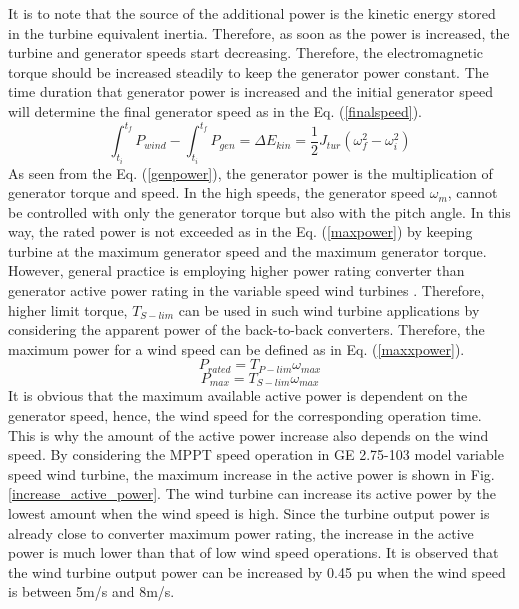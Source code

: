 It is to note that the source of the additional power is the kinetic energy stored in the turbine equivalent inertia. Therefore, as soon as the power is increased, the turbine and generator speeds start decreasing. Therefore, the electromagnetic torque should be increased steadily to keep the generator power constant. The time duration that generator power is increased and the initial generator speed will determine the final generator speed as in the Eq. (\ref{finalspeed}).
\begin{equation}
 \int_{t_{i}}^{t_{f}}P_{wind}- \int_{t_{i}}^{t_{f}}P_{gen}=\Delta E_{kin}=\frac{1}{2}J_{tur}(\omega_{f}^2-\omega_{i}^2)
\label{finalspeed}
\end{equation}
As seen from the Eq. (\ref{genpower}), the generator power is the multiplication of generator torque and speed. In the high speeds, the generator speed $\omega_{m}$, cannot be controlled with only the generator torque but also with the pitch angle. In this way, the rated power is not exceeded as in the Eq. (\ref{maxpower}) by keeping turbine at the maximum generator speed and the maximum generator torque. However, general practice is employing higher power rating converter than generator active power rating in the variable speed wind turbines \cite{Muljadi2012}.  Therefore, higher limit torque, $T_{S-lim}$ can be used in such wind turbine applications by considering the apparent power of the back-to-back converters. Therefore, the maximum power for a wind speed can be defined as in Eq. (\ref{maxxpower}).
\begin{equation}
P_{rated}=T_{P-lim} \omega_{max}
\label{maxpower}
\end{equation}
\begin{equation}
P_{max}=T_{S-lim} \omega_{max}
\label{maxxpower}
\end{equation}
It is obvious that the maximum available active power is dependent on the generator speed, hence, the wind speed for the corresponding operation time. This is why the amount of the active power increase also depends on the wind speed. By considering the MPPT speed operation in GE 2.75-103 model variable speed wind turbine, the maximum increase in the active power is shown in Fig. \ref{increase_active_power}. The wind turbine can increase its active power by the lowest amount when the wind speed is high. Since the turbine output power is already close to converter maximum power rating, the increase in the active power is much lower than that of low wind speed operations. It is observed that the wind turbine output power can be increased by 0.45 pu when the wind speed is between 5m/s and 8m/s. \par
